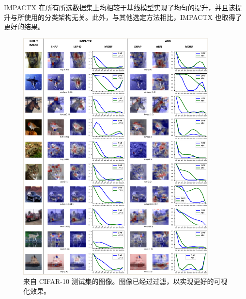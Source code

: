 \documentclass[12pt, a4paper]{ctexart} %
\begin{document}
IMPACTX 在所有所选数据集上均相较于基线模型实现了均匀的提升，并且该提升与所使用的分类架构无关。此外，与其他选定方法相比，IMPACTX 也取得了更好的结果。
\begin{figure}[H]
  \centering
  \includegraphics[width=0.9\textwidth]{img/IMPACTX_3.png}
  \caption{来自 CIFAR-10 测试集的图像。图像已经过过滤，以实现更好的可视化效果。}
\end{figure}
\end{document}

